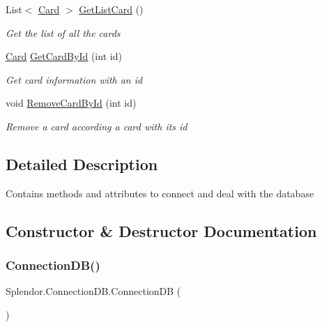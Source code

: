 \begin{DoxyCompactItemize}
List$<$ \hyperlink{class_splendor_1_1_card}{Card} $>$ \hyperlink{class_splendor_1_1_connection_d_b_a020bd54ace4a6b36ccc8c1661d5322e7}{Get\+List\+Card} ()
\begin{DoxyCompactList}\small\item\em Get the list of all the cards \end{DoxyCompactList}\item 
\hyperlink{class_splendor_1_1_card}{Card} \hyperlink{class_splendor_1_1_connection_d_b_a1d7511e41b837b176737fd1b8d19f921}{Get\+Card\+By\+Id} (int id)
\begin{DoxyCompactList}\small\item\em Get card information with an id \end{DoxyCompactList}\item 
void \hyperlink{class_splendor_1_1_connection_d_b_a00d157ae467fdd310bf38626472175b6}{Remove\+Card\+By\+Id} (int id)
\begin{DoxyCompactList}\small\item\em Remove a card according a card with it\textquotesingle{}s id \end{DoxyCompactList}\end{DoxyCompactItemize}


\subsection{Detailed Description}
Contains methods and attributes to connect and deal with the database 



\subsection{Constructor \& Destructor Documentation}
\mbox{\label{class_splendor_1_1_connection_d_b_aaaa5c66d4f12702d36a76dd21beb62c4}} 
\subsubsection{\texorpdfstring{Connection\+D\+B()}{ConnectionDB()}}
{\footnotesize\ttfamily Splendor.\+Connection\+D\+B.\+Connection\+DB (\begin{DoxyParamCaption}{ }\end{DoxyParamCaption})}



